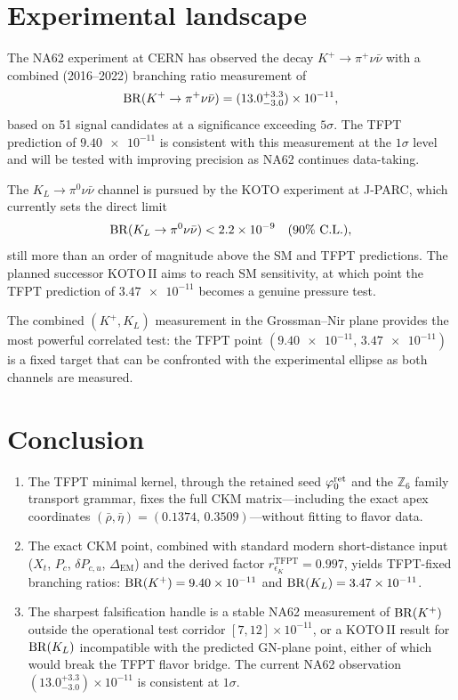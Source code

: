 \section{Experimental landscape}
\label{sec:experiment}

The NA62 experiment at CERN has observed the decay
$K^+\to\pi^+\nu\bar\nu$ with a combined (2016--2022)
branching ratio measurement of \cite{NA62obs}
\[
\mathrm{BR}(K^+\to\pi^+\nu\bar\nu)
=
(13.0^{+3.3}_{-3.0})\times 10^{-11},
\]
based on 51 signal candidates at a significance exceeding $5\sigma$.
The TFPT prediction of $\num{9.40e-11}$ is consistent with this
measurement at the $1\sigma$ level and will be tested with improving
precision as NA62 continues data-taking.

The $K_L\to\pi^0\nu\bar\nu$ channel is pursued by the KOTO experiment
at J-PARC, which currently sets the direct limit \cite{KOTO}
\[
\mathrm{BR}(K_L\to\pi^0\nu\bar\nu)<\num{2.2e-9}
\quad\text{(90\% C.L.)},
\]
still more than an order of magnitude above the SM and TFPT predictions.
The planned successor KOTO\,II aims to reach SM sensitivity, at which
point the TFPT prediction of $\num{3.47e-11}$ becomes a genuine
pressure test.

The combined $(K^+,K_L)$ measurement in the Grossman--Nir plane
provides the most powerful correlated test: the TFPT point
$(\num{9.40e-11},\,\num{3.47e-11})$ is a fixed target that can be
confronted with the experimental ellipse as both channels are measured.


\section{Conclusion}
\label{sec:conclusion}

\begin{tcolorbox}[colback=gray!4, colframe=gray!60, breakable,
    title={\textbf{Summary}}, fonttitle=\bfseries]
\begin{enumerate}[label=\arabic*., leftmargin=1.6em, itemsep=0.3em]
\item The TFPT minimal kernel, through the retained seed $\varphi_{0}^{\mathrm{ret}}$ and the
$\mathbb Z_6$ family transport grammar, fixes the full CKM matrix---including
the exact apex coordinates $(\bar\rho,\bar\eta)=(0.1374,\,0.3509)$---without
fitting to flavor data.
\item The exact CKM point, combined with standard modern short-distance input
($X_t$, $P_c$, $\delta P_{c,u}$, $\Delta_{\mathrm{EM}}$) and the
derived factor $r_{\epsilon_K}^{\mathrm{TFPT}}=0.997$,
yields TFPT-fixed branching ratios:
$\mathrm{BR}(K^+)=\num{9.40e-11}$ and $\mathrm{BR}(K_L)=\num{3.47e-11}$.
\item The sharpest falsification handle is a stable NA62 measurement of
$\mathrm{BR}(K^+)$ outside the operational test corridor $[7,12]\times 10^{-11}$,
or a KOTO\,II result for $\mathrm{BR}(K_L)$ incompatible with the predicted
GN-plane point, either of which would break the TFPT flavor bridge.
The current NA62 observation $(13.0^{+3.3}_{-3.0})\times 10^{-11}$
is consistent at $1\sigma$.
\end{enumerate}
\end{tcolorbox}



